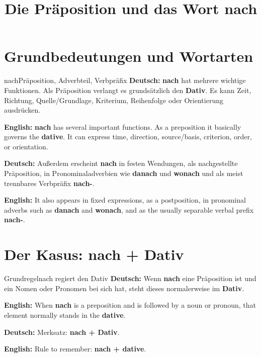 \documentclass[a4paper,11pt]{article}
\title{Die Präposition und das Wort \glqq nach\grqq}
\date{}
\newcommand{\GermanText}[1]{\textbf{Deutsch: }#1\par}
\newcommand{\EnglishText}[1]{{\small\color{SoftGray}\textbf{English: }#1\par}}
\begin{document}
    \maketitle
    \setcounter{tocdepth}{1}
    \tableofcontents
    \newpage

    \section{Grundbedeutungen und Wortarten}

        \begin{grammarentry}{nach}{Präposition, Adverbteil, Verbpräfix}
            \GermanText{\textbf{nach} hat mehrere wichtige Funktionen. Als Präposition verlangt es grundsätzlich den \textbf{Dativ}. Es kann Zeit, Richtung, Quelle/Grundlage, Kriterium, Reihenfolge oder Orientierung ausdrücken.}
            \EnglishText{\textbf{nach} has several important functions. As a preposition it basically governs the \textbf{dative}. It can express time, direction, source/basis, criterion, order, or orientation.}

            \GermanText{Außerdem erscheint \textbf{nach} in festen Wendungen, als nachgestellte Präposition, in Pronominaladverbien wie \textbf{danach} und \textbf{wonach} und als meist trennbares Verbpräfix \textbf{nach-}.}
            \EnglishText{It also appears in fixed expressions, as a postposition, in pronominal adverbs such as \textbf{danach} and \textbf{wonach}, and as the usually separable verbal prefix \textbf{nach-}.}
        \end{grammarentry}


    \section{Der Kasus: nach + Dativ}

        \begin{grammarentry}{Grundregel}{nach regiert den Dativ}
            \GermanText{Wenn \textbf{nach} eine Präposition ist und ein Nomen oder Pronomen bei sich hat, steht dieses normalerweise im \textbf{Dativ}.}
            \EnglishText{When \textbf{nach} is a preposition and is followed by a noun or pronoun, that element normally stands in the \textbf{dative}.}

            \GermanText{Merksatz: \textbf{nach + Dativ}.}
            \EnglishText{Rule to remember: \textbf{nach + dative}.}
        \end{grammarentry}
\end{document}

